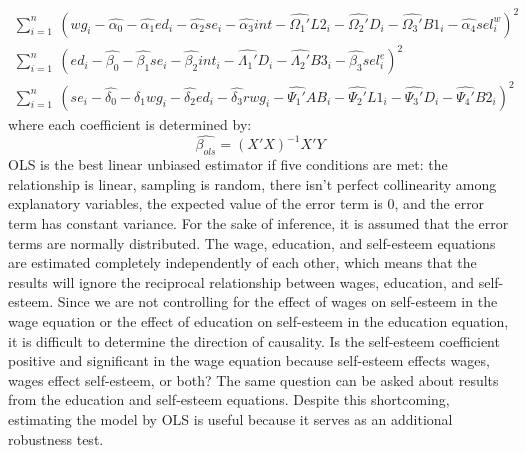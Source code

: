 \documentclass[12pt]{report}
\newcommand{\beq}{\begin{equation}}
\newcommand{\eeq}{\end{equation}}
\begin{document}
\begin{eqnarray}
\sum_{i=1}^n\ (wg_i - \hat{\alpha_0} - \hat{\alpha_1} ed_i - \hat{\alpha_2} se_i - \hat{\alpha_3} int - \hat{\Omega_1'} L2_i - \hat{\Omega_2'} D_i - \hat{\Omega_3'} B1_i - \hat{\alpha_4} sel_i^w)^2 \\
\sum_{i=1}^n\ (ed_i - \hat{\beta_0} - \hat{\beta_1} se_i - \hat{\beta_2} int_i - \hat{\Lambda_1'} D_i - \hat{\Lambda_2'} B3_i - \hat{\beta_3} sel_i^e)^2\\
\sum_{i=1}^n\ (se_i - \hat{\delta_0} - \hat{\delta_1} wg_i - \hat{\delta_2} ed_i - \hat{\delta_3} rwg_i  - \hat{\Psi_1'} AB_i - \hat{\Psi_2'} L1_i - \hat{\Psi_3'} D_i - \hat{\Psi_4'} B2_i)^2
\end{eqnarray}
where each coefficient is determined by:
\beq \hat{\beta_{ols}} = (X' X)^{-1} X' Y\eeq
OLS is the best linear unbiased estimator if five conditions are met: the relationship is linear, sampling is random, there isn't perfect collinearity among explanatory variables, the expected value of the error term is 0, and the error term has constant variance. For the sake of inference, it is assumed that the error terms are normally distributed. The wage, education, and self-esteem equations are estimated completely independently of each other, which means that the results will ignore the reciprocal relationship between wages, education, and self-esteem. Since we are not controlling for the effect of wages on self-esteem in the wage equation or the effect of education on self-esteem in the education equation, it is difficult to determine the direction of causality. Is the self-esteem coefficient positive and significant in the wage equation because self-esteem effects wages, wages effect self-esteem, or both? The same question can be asked about results from the education and self-esteem equations. Despite this shortcoming, estimating the model by OLS is useful because it serves as an additional robustness test.
\end{document}
